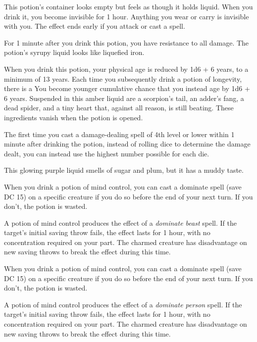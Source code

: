 \documentclass[10pt,a4paper,twoside,bg=print,twocolumn,openany,nodeprecatedcode]{dndbook}
\begin{document}
This potion's container looks empty but feels as though it holds liquid. When you drink it, you become invisible for 1 hour. Anything you wear or carry is invisible with you. The effect ends early if you attack or cast a spell.

For 1 minute after you drink this potion, you have resistance to all damage. The potion's syrupy liquid looks like liquefied iron.

When you drink this potion, your physical age is reduced by 1d6 + 6 years, to a minimum of 13 years. Each time you subsequently drink a potion of longevity, there is a You become younger cumulative chance that you instead age by 1d6 + 6 years. Suspended in this amber liquid are a scorpion's tail, an adder's fang, a dead spider, and a tiny heart that, against all reason, is still beating. These ingredients vanish when the potion is opened.

The first time you cast a damage-dealing spell of 4th level or lower within 1 minute after drinking the potion, instead of rolling dice to determine the damage dealt, you can instead use the highest number possible for each die.

This glowing purple liquid smells of sugar and plum, but it has a muddy taste.

When you drink a potion of mind control, you can cast a dominate spell (save DC 15) on a specific creature if you do so before the end of your next turn. If you don't, the potion is wasted.

A potion of mind control produces the effect of a \textit{dominate beast} spell. If the target's initial saving throw fails, the effect lasts for 1 hour, with no concentration required on your part. The charmed creature has disadvantage on new saving throws to break the effect during this time.

When you drink a potion of mind control, you can cast a dominate spell (save DC 15) on a specific creature if you do so before the end of your next turn. If you don't, the potion is wasted.

A potion of mind control produces the effect of a \textit{dominate person} spell. If the target's initial saving throw fails, the effect lasts for 1 hour, with no concentration required on your part. The charmed creature has disadvantage on new saving throws to break the effect during this time.
\end{document}
